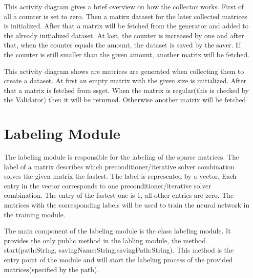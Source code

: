 \documentclass[parskip=full]{scrartcl}
\begin{document}
This activity diagram gives a brief overview on how the collector works. First of all a counter is set to zero. Then a matirx dataset for the later collected matrices is initialized. After that a matrix will be fetched from the generator and added to the already initialized dataset.
At last, the counter is increased by one and after that, when the counter equals the amount, the dataset is saved by the saver. If the counter is still smaller than the given amount, another matrix will be fetched. 

\newpage
\begin{figure}[h]
\begin{center}

\label{Activity Diagrams}
\end{center}
\end{figure}
\newpage

This activity diagram shows are matrices are generated when collecting them to create a dataset. At first an empty matrix with the given size is initialized. After that a matrix is fetched from ssget. When the matrix is regular(this is checked by the Validator) then it will be returned. Otherwise another matrix will be fetched.

\section{Labeling Module}
The labeling module is responsible for the labeling of the sparse matrices. The \gls{label} of a matrix describes which \gls{preconditioner}/\gls{iterative solver} combination solves the given matrix the fastest. The \gls{label} is represented by a vector. Each entry in the vector corresponds to one \gls{preconditioner}/\gls{iterative solver} combination. The entry of the fastest one is 1, all other entries are zero. The matrices with the corresponding \glspl{label} will be used to train the neural network in the training module.

\newpage
\begin{figure}[h]
\begin{center}

\label{Labeling Module}
\end{center}
\end{figure}
\newpage

The main component of the labeling module is the class labeling module. It provides the only public method in the labling module, the method start(path:String, savingName:String,savingPath:String). This method is the entry point of the module and will start the labeling process of the provided matrices(specified by the path). \newline\newline
\end{document}
